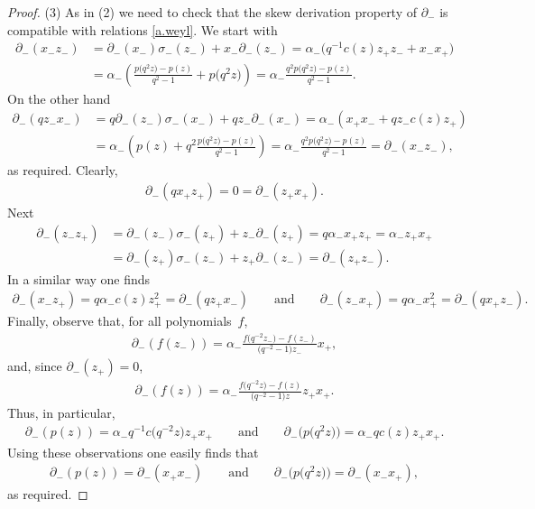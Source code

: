 \documentclass[pdftex]{sigma}
\numberwithin{equation}{section}
\begin{document}
\begin{proof}
(3) As in (2) we need to check that the skew derivation property of $\partial_-$ is compatible with relations \eqref{a.weyl}. We start with
\begin{align*}
\partial_-(x_-z_-) &= \partial_-(x_-)\sigma_-(z_-) + x_- \partial_-(z_-) = \alpha_-\big(q^{-1}c(z)z_+z_- +x_-x_+\big)\\
&= \alpha_-\left(\frac{p\big(q^2z\big) -p(z)}{q^2 -1} +p\big(q^2z\big)\right)= \alpha_-\frac{q^2p\big(q^2z\big) -p(z)}{q^2 -1}.
\end{align*}
On the other hand
\begin{align*}
\partial_-(qz_-x_-) &= q \partial_-(z_-)\sigma_-(x_-) + qz_- \partial_-(x_-) = \alpha_-(x_+x_- + qz_-c(z)z_+)\\
&= \alpha_-\left(p(z) + q^2\frac{p\big(q^2z\big) -p(z)}{q^2 -1} \right) = \alpha_-\frac{q^2p\big(q^2z\big) -p(z)}{q^2 -1} = \partial_-(x_-z_-),
\end{align*}
as required. Clearly,
\begin{gather*}
\partial_-(qx_+z_+) = 0 = \partial_-(z_+x_+).
\end{gather*}
 Next
\begin{align*}
\partial_-(z_-z_+) &= \partial_-(z_-)\sigma_-(z_+) + z_- \partial_-(z_+) = q\alpha_-x_+z_+ = \alpha_-z_+x_+\\
& = \partial_-(z_+)\sigma_-(z_-) + z_+ \partial_-(z_-) = \partial_-(z_+z_-).
\end{align*}
In a similar way one f\/inds
\begin{gather*}
\partial_-(x_-z_+) = q\alpha_-c(z) z_+^2 = \partial_-(qz_+x_-) \qquad \mbox{and} \qquad \partial_-(z_-x_+) = q\alpha_- x_+^2 = \partial_-(qx_+z_-) .
\end{gather*}
Finally, observe that, for all polynomials~$f$,
\begin{gather*}%
\partial_-(f(z_-)) = \alpha_-\frac{f\big(q^{-2}z_-\big) -f(z_-)}{\big(q^{-2} -1\big)z_-}x_+,
\end{gather*}
and, since $\partial_-(z_+) =0$,
\begin{gather*}%
\partial_-(f(z)) = \alpha_-\frac{f\big(q^{-2}z\big) -f(z)}{\big(q^{-2} -1\big)z}z_+x_+.
\end{gather*}
Thus, in particular,
\begin{gather*}
\partial_-(p(z)) = \alpha_- q^{-1}c\big(q^{-2}z\big)z_+x_+ \qquad \mbox{and} \qquad \partial_-\big(p\big(q^2z\big)\big) = \alpha_- q c(z)z_+x_+.
\end{gather*}
Using these observations one easily f\/inds that
\begin{gather*}
\partial_-(p(z)) = \partial_-(x_+x_-) \qquad \mbox{and} \qquad \partial_-\big(p\big(q^2z\big)\big) = \partial_-(x_-x_+),
\end{gather*}
as required.


\end{proof}
\end{document}
